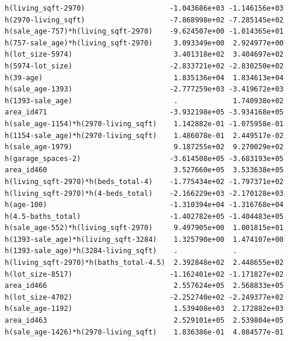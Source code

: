 \documentclass[
]{article}
\begin{document}
\begin{verbatim}
h(living_sqft-2970)                    -1.043686e+03 -1.146156e+03
h(2970-living_sqft)                    -7.868998e+02 -7.285145e+02
h(sale_age-757)*h(living_sqft-2970)    -9.624507e+00 -1.014365e+01
h(757-sale_age)*h(living_sqft-2970)     3.093349e+00  2.924977e+00
h(lot_size-5974)                        3.401318e+02  3.404697e+02
h(5974-lot_size)                       -2.833721e+02 -2.830250e+02
h(39-age)                               1.835136e+04  1.834613e+04
h(sale_age-1393)                       -2.777259e+03 -3.419672e+03
h(1393-sale_age)                        .             1.740938e+02
area_id471                             -3.932198e+05 -3.934168e+05
h(sale_age-1154)*h(2970-living_sqft)    1.142882e-01 -1.075958e-01
h(1154-sale_age)*h(2970-living_sqft)    1.486078e-01  2.449517e-02
h(sale_age-1979)                        9.187255e+02  9.270029e+02
h(garage_spaces-2)                     -3.614508e+05 -3.683193e+05
area_id460                              3.527660e+05  3.533638e+05
h(living_sqft-2970)*h(beds_total-4)    -1.775434e+02 -1.797371e+02
h(living_sqft-2970)*h(4-beds_total)    -2.166229e+03 -2.170128e+03
h(age-100)                             -1.310394e+04 -1.316768e+04
h(4.5-baths_total)                     -1.402782e+05 -1.404483e+05
h(sale_age-552)*h(living_sqft-2970)     9.497905e+00  1.001815e+01
h(1393-sale_age)*h(living_sqft-3284)    1.325790e+00  1.474107e+00
h(1393-sale_age)*h(3284-living_sqft)    .             .           
h(living_sqft-2970)*h(baths_total-4.5)  2.392848e+02  2.448655e+02
h(lot_size-8517)                       -1.162401e+02 -1.171827e+02
area_id466                              2.557624e+05  2.568833e+05
h(lot_size-4702)                       -2.252740e+02 -2.249377e+02
h(sale_age-1192)                        1.539408e+03  2.172882e+03
area_id463                              2.529101e+05  2.539804e+05
h(sale_age-1426)*h(2970-living_sqft)    1.836386e-01  4.084577e-01
                                                                  

\end{verbatim}
\end{document}
